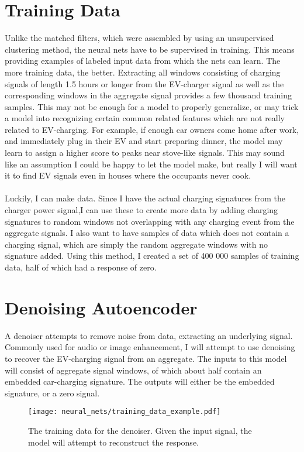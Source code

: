 \documentclass[12pt, american]{report}
\begin{document}
\section{Training Data}
Unlike the matched filters, which were assembled by using an unsupervised clustering method, the neural nets have to be supervised in training. This means providing examples of labeled input data from which the nets can learn. The more training data, the better. Extracting all windows consisting of charging signals of length 1.5 hours or longer from the EV-charger signal as well as the corresponding windows in the aggregate signal provides a few thousand training samples. This may not be enough for a model to properly generalize, or may trick a model into recognizing certain common related features which are not really related to EV-charging. For example, if enough car owners come home after work, and immediately plug in their EV and start preparing dinner, the model may learn to assign a higher score to peaks near stove-like signals. This may sound like an assumption I could be happy to let the model make, but really I will want it to find EV signals even in houses where the occupants never cook. \\
\\
Luckily, I can make data. Since I have the actual charging signatures from the charger power signal,I can use these to create more data by adding charging signatures to random windows not overlapping with any charging event from the aggregate signals. I also want to have samples of data which does not contain a charging signal, which are simply the random aggregate windows with no signature added. Using this method, I created a set of 400 000 samples of training data, half of which had a response of zero.

\section{Denoising Autoencoder}
A denoiser attempts to remove noise from data, extracting an underlying signal. Commonly used for audio or image enhancement, I will attempt to use denoising to recover the EV-charging signal from an aggregate. The inputs to this model will consist of aggregate signal windows, of which about half contain an embedded car-charging signature. The outputs will either be the embedded signature, or a zero signal.\\

\begin{figure}[h]
\centering
\caption{The training data for the denoiser. Given the input signal, the model will attempt to reconstruct the response.}
\label{fig:denoiser_data}
\texttt{[image: neural\_nets/training\_data\_example.pdf]}
\end{figure}
\end{document}
